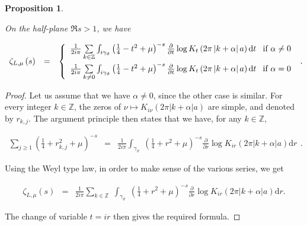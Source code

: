 \documentclass{jams-l}
\newtheorem{proposition}[theorem]{Proposition}
\theoremstyle{definition}
\theoremstyle{remark}
\numberwithin{equation}{section}
\begin{document}
        \begin{proposition}
        \label{PropSpectralZetaIntegralRepresentation}
        
            On the half-plane $\Re s > 1$, we have
            
            \[ \begin{array}{lll}
                    \zeta_{L,\mu} \left( s \right) & = & \left \{ \begin{array}{ll} \frac{1}{2 i \pi} \sum\limits_{k \in \mathbb{Z}} \int_{i \gamma_{\vartheta}} \left( \frac{1}{4} - t^2 + \mu \right)^{-s} \frac{\partial}{\partial t} \log K_t \left( 2 \pi \left \vert k + \alpha \right \vert a \right) \mathrm{d}t & \hspace{-0.2em} \text{if } \alpha \neq 0 \\[1em] \frac{1}{2 i \pi} \sum\limits_{k \neq 0} \int_{i \gamma_{\vartheta}} \left( \frac{1}{4} - t^2 + \mu \right)^{-s} \frac{\partial}{\partial t} \log K_t \left( 2 \pi \left \vert k + \alpha \right \vert a \right) \mathrm{d}t & \hspace{-0.2em} \text{if } \alpha = 0 \end{array} \right.
                \end{array} . \]
        
        \end{proposition}
        
        \begin{proof}
        
            Let us assume that we have $\alpha \neq 0$, since the other case is similar. For every integer $k \in \mathbb{Z}$, the zeros of $\nu \mapsto K_{i \nu} \left( 2 \pi \left \vert k + \alpha \right \vert a \right)$ are simple, and denoted by $r_{k,j}$. The argument principle then states that we have, for any $k \in \mathbb{Z}$,
            
            \[ \begin{array}{lll}
                    \sum\limits_{j \geqslant 1} \left( \frac{1}{4} + r_{k,j}^2 + \mu \right)^{-s} & = & \frac{1}{2 i \pi} \int_{\gamma_{\vartheta}} \; \left( \frac{1}{4} + r^2 + \mu \right)^{-s} \frac{\partial}{\partial r} \log K_{ir} \left( 2 \pi \left \vert k+\alpha \right \vert a \right) \mathrm{d}r
                \end{array} . \]
            
            \noindent Using the Weyl type law, in order to make sense of the various series, we get
            
            \[ \begin{array}{lll}
                    \zeta_{L, \mu} \left( s \right) & = & \frac{1}{2 i \pi} \sum\limits_{k \in \mathbb{Z}} \; \int_{\gamma_{\vartheta}} \; \left( \frac{1}{4} + r^2 + \mu \right)^{-s} \frac{\partial}{\partial r} \log K_{ir} \left( 2 \pi \left \vert k+\alpha \right \vert a \right) \mathrm{d}r.
                \end{array} \]
            
            \noindent The change of variable $t = ir$ then gives the required formula.
        
        \end{proof}
        
\end{document}

